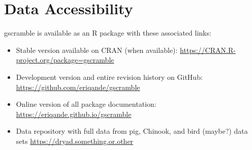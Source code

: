 \section*{Data Accessibility}

{\sc gscramble} is available as an R package with these associated links:
\begin{itemize}
\item Stable version available on CRAN (when available): \url{https://CRAN.R-project.org/package=gscramble}
\item Development version and entire revision history on GitHub: \url{https://github.com/eriqande/gscramble}
\item Online version of all package documentation: \url{https://eriqande.github.io/gscramble}
\item Data repository with full data from pig, Chinook, and bird (maybe?) data sets \url{https://dryad.something.or.other}
\end{itemize}
\mbox{}

